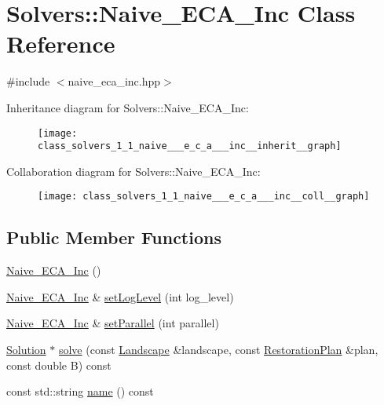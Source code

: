 \hypertarget{class_solvers_1_1_naive___e_c_a___inc}{}\section{Solvers\+:\+:Naive\+\_\+\+E\+C\+A\+\_\+\+Inc Class Reference}
\label{class_solvers_1_1_naive___e_c_a___inc}


{\ttfamily \#include $<$naive\+\_\+eca\+\_\+inc.\+hpp$>$}



Inheritance diagram for Solvers\+:\+:Naive\+\_\+\+E\+C\+A\+\_\+\+Inc\+:\nopagebreak
\begin{figure}[H]
\begin{center}
\leavevmode
\texttt{[image: class\_solvers\_1\_1\_naive\_\_\_e\_c\_a\_\_\_inc\_\_inherit\_\_graph]}
\end{center}
\end{figure}


Collaboration diagram for Solvers\+:\+:Naive\+\_\+\+E\+C\+A\+\_\+\+Inc\+:\nopagebreak
\begin{figure}[H]
\begin{center}
\leavevmode
\texttt{[image: class\_solvers\_1\_1\_naive\_\_\_e\_c\_a\_\_\_inc\_\_coll\_\_graph]}
\end{center}
\end{figure}
\subsection*{Public Member Functions}
\begin{DoxyCompactItemize}
\item 
\hyperlink{class_solvers_1_1_naive___e_c_a___inc_afca996d30836e4e6192373e00d6ed39f}{Naive\+\_\+\+E\+C\+A\+\_\+\+Inc} ()
\item 
\hyperlink{class_solvers_1_1_naive___e_c_a___inc}{Naive\+\_\+\+E\+C\+A\+\_\+\+Inc} \& \hyperlink{class_solvers_1_1_naive___e_c_a___inc_aa9231733d9dbc55a6f61a3811a3ebac1}{set\+Log\+Level} (int log\+\_\+level)
\item 
\hyperlink{class_solvers_1_1_naive___e_c_a___inc}{Naive\+\_\+\+E\+C\+A\+\_\+\+Inc} \& \hyperlink{class_solvers_1_1_naive___e_c_a___inc_a92d4284d10fd5d001a6ace0420361e5a}{set\+Parallel} (int parallel)
\item 
\hyperlink{class_solution}{Solution} $\ast$ \hyperlink{class_solvers_1_1_naive___e_c_a___inc_af0830eeb54be59ae2f363a32f38cee0c}{solve} (const \hyperlink{class_landscape}{Landscape} \&landscape, const \hyperlink{class_restoration_plan}{Restoration\+Plan} \&plan, const double B) const
\item 
const std\+::string \hyperlink{class_solvers_1_1_naive___e_c_a___inc_ace6070af722e226fcd2f9b746cc12944}{name} () const
\end{DoxyCompactItemize}
